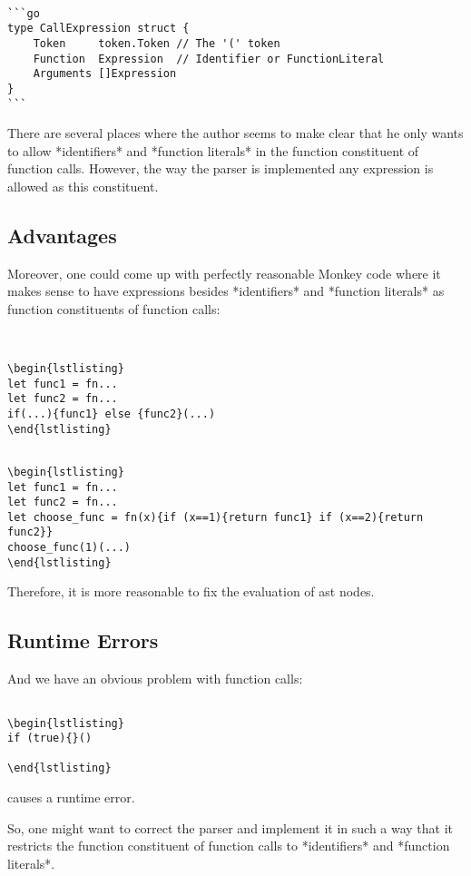 \documentclass[a4paper,10pt]{article}
\begin{document}
\begin{verbatim}

```go
type CallExpression struct {
	Token     token.Token // The '(' token
	Function  Expression  // Identifier or FunctionLiteral
	Arguments []Expression
}
``` 
\end{verbatim}

There are several places where the author seems to make clear that he only wants to allow *identifiers* and *function literals* 
in the function constituent of function calls. However, the way the parser is implemented any expression is allowed as this constituent.

\subsection{Advantages}

 Moreover, one could come up with perfectly reasonable Monkey code where it makes sense to have expressions besides *identifiers* and *function literals* 
as function constituents of function calls:

\begin{verbatim}
 

\begin{lstlisting}
let func1 = fn...
let func2 = fn...
if(...){func1} else {func2}(...)
\end{lstlisting}
\end{verbatim}

\begin{verbatim}

\begin{lstlisting}
let func1 = fn...
let func2 = fn...
let choose_func = fn(x){if (x==1){return func1} if (x==2){return func2}}
choose_func(1)(...)
\end{lstlisting}
\end{verbatim}


Therefore, it is more reasonable to fix the evaluation of ast nodes.



\subsection{Runtime Errors}
And we have an obvious problem with function calls:
\begin{verbatim}
 
\begin{lstlisting}
if (true){}()

\end{lstlisting}
\end{verbatim}
causes a runtime error.

So, one might want to correct the parser and implement it in such a way that it restricts the function constituent of function calls to *identifiers* and *function literals*.
\end{document}
